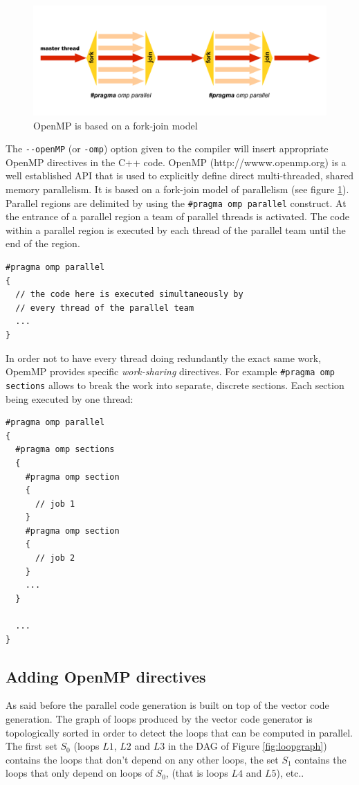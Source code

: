 \documentclass[a4paper,10pt]{book}
\begin{document}
\begin{figure}[htb]
  \centering
  \includegraphics[scale=0.5,angle=-90]{images/openmp-model}
  \caption{OpenMP is based on a fork-join model}   
  \label{fig:openmp}
\end{figure}

The \lstinline!--openMP! (or \lstinline!-omp!) option given to the \faust compiler will insert appropriate OpenMP directives in the C++ code. OpenMP (http://wwww.openmp.org) is a well established API that is used to explicitly define direct multi-threaded, shared memory parallelism. It is based on a fork-join model of parallelism (see figure \ref{fig:openmp}). 
Parallel regions are delimited by using the \lstinline!#pragma omp parallel! construct. At the entrance of a parallel region a team of parallel threads is activated. The code within a parallel region is executed by each thread of the parallel team until the end of the region. 

\begin{lstlisting}
#pragma omp parallel
{
  // the code here is executed simultaneously by 
  // every thread of the parallel team
  ...
}
\end{lstlisting}

In order not to have every thread doing redundantly the exact same work, OpemMP provides specific \textit{work-sharing} directives. For example \lstinline!#pragma omp sections! allows to break the work into separate, discrete sections. Each section being executed by one thread:

\begin{lstlisting}
#pragma omp parallel
{
  #pragma omp sections
  {
    #pragma omp section
    {
      // job 1
    }
    #pragma omp section
    {
      // job 2
    }
    ...
  }

  ...
}
\end{lstlisting}

\subsection{Adding OpenMP directives}
As said before the parallel code generation is built on top of the vector code generation. The graph of loops produced by the vector code generator is topologically sorted in order to detect the loops that can be computed in parallel. The first set $S_0$ (loops $L1$, $L2$ and $L3$ in the DAG of Figure \ref{fig:loopgraph}) contains the loops that don't depend on any other loops, the set $S_1$ contains the loops that only depend on loops of $S_0$, (that is loops $L4$ and $L5$), etc.. 
\end{document}
